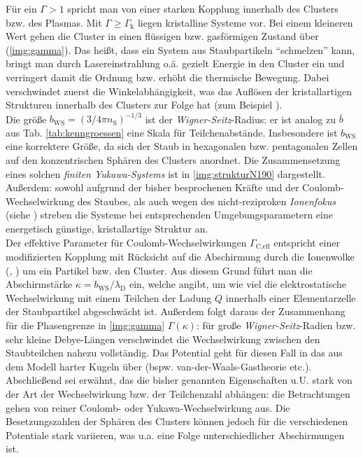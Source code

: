 \documentclass[numbers=noenddot,a4paper]{scrartcl}
\newcommand{\ix}[1]{_\text{#1}}
\newcommand{\tilt}[1]{\textit{#1}}
\begin{document}
					Für ein $\Gamma>1$ spricht man von einer starken Kopplung innerhalb des Clusters bzw. des Plasmas. Mit $\Gamma\geq\Gamma\ix{k}$ liegen kristalline Systeme vor. Bei einem kleineren Wert gehen die Cluster in einen flüssigen bzw. gasförmigen Zustand über (\ref{img:gamma}). Das heißt, dass ein System aus Staubpartikeln "`schmelzen"' kann, bringt man durch Lasereinstrahlung o.ä. gezielt Energie in den Cluster ein und verringert damit die Ordnung bzw. erhöht die thermische Bewegung. Dabei verschwindet zuerst die Winkelabhängigkeit, was das Auflösen der kristallartigen Strukturen innerhalb des Clusters zur Folge hat (zum Beispiel \cite{Thomas96}).\\
					Die größe $b\ix{WS}=\left(3/4\pi n\ix{S}\right)^{-1/3}$ ist der \tilt{Wigner-Seitz}-Radius: er ist analog zu $\overline{b}$ aus Tab. \ref{tab:kenngroessen} eine Skala für Teilchenabstände. Insbesondere ist $b\ix{WS}$ eine korrektere Größe, da sich der Staub in hexagonalen bzw. pentagonalen Zellen auf den konzentrischen Sphären des Clusters anordnet. Die Zusammensetzung eines solchen \tilt{finiten Yukawa-Systems} ist in \ref{img:strukturN190} dargestellt. Außerdem: sowohl aufgrund der bisher besprochenen Kräfte und der Coulomb-Wechselwirkung des Staubes, als auch wegen des nicht-reziproken \tilt{Ionenfokus} (siehe \cite{Melzer95c}) streben die Systeme bei entsprechenden Umgebungsparametern eine energetisch günstige, kristallartige Struktur an. \\
					Der effektive Parameter für Coulomb-Wechselwirkungen $\Gamma\ix{C,eff}$ entspricht einer modifizierten Kopplung mit Rücksicht auf die Abschirmung durch die Ionenwolke (\cite{Lampe00}, \cite{Schweigert00d}) um ein Partikel bzw. den Cluster. Aus diesem Grund führt man die Abschirmstärke $\kappa=b\ix{WS}/\lambda\ix{D}$ ein, welche angibt, um wie viel die elektrostatische Wechselwirkung mit einem Teilchen der Ladung $Q$ innerhalb einer Elementarzelle der Staubpartikel abgeschwächt ist. Außerdem folgt daraus der Zusammenhang für die Phasengrenze in \ref{img:gamma} $\Gamma\left(\kappa\right)$: für große \tilt{Wigner-Seitz}-Radien bzw. sehr kleine Debye-Längen verschwindet die Wechselwirkung zwischen den Staubteilchen nahezu vollständig. Das Potential geht für diesen Fall in das aus dem Modell harter Kugeln über (bspw. van-der-Waals-Gastheorie etc.).\\
					Abschließend sei erwähnt, das die bisher genannten Eigenschaften u.U. stark von der Art der Wechselwirkung bzw. der Teilchenzahl abhängen: die Betrachtungen gehen von reiner Coulomb- oder Yukawa-Wechselwirkung aus. Die Besetzungszahlen der Sphären des Clusters können jedoch für die verschiedenen Potentiale stark variieren, was u.a. eine Folge unterschiedlicher Abschirmungen ist.
\end{document}
